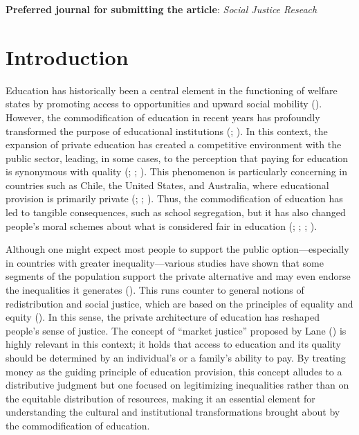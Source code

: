 \documentclass[
  spanish,
  a4paper,
  oneside]{scrbook}
\begin{document}
\textbf{Preferred journal for submitting the article}: \emph{Social
Justice Reseach}


\chapter{Introduction}\label{introduction}

Education has historically been a central element in the functioning of
welfare states by promoting access to opportunities and upward social
mobility ().
However, the commodification of education in recent years has profoundly
transformed the purpose of educational institutions
(; ). In this context,
the expansion of private education has created a competitive environment
with the public sector, leading, in some cases, to the perception that
paying for education is synonymous with quality
(;
;
). This phenomenon is
particularly concerning in countries such as Chile, the United States,
and Australia, where educational provision is primarily private
(;
;
).
Thus, the commodification of education has led to tangible consequences,
such as school segregation, but it has also changed people's moral
schemes about what is considered fair in education
(; ;
;
).

Although one might expect most people to support the public
option---especially in countries with greater inequality---various
studies have shown that some segments of the population support the
private alternative and may even endorse the inequalities it generates
(). This runs counter to
general notions of redistribution and social justice, which are based on
the principles of equality and equity
(). In this sense, the
private architecture of education has reshaped people's sense of
justice. The concept of ``market justice'' proposed by Lane
() is highly relevant in this
context; it holds that access to education and its quality should be
determined by an individual's or a family's ability to pay. By treating
money as the guiding principle of education provision, this concept
alludes to a distributive judgment but one focused on legitimizing
inequalities rather than on the equitable distribution of resources,
making it an essential element for understanding the cultural and
institutional transformations brought about by the commodification of
education.
\end{document}

